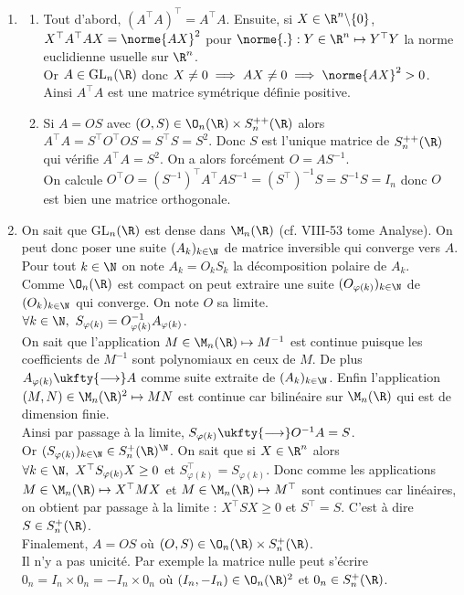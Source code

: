 \documentclass[8pt]{book}
\begin{document}
\begin{enumerate}[leftmargin=*]
\begin{enumerate}[label=\alph*.]
			On vérifie alors que $v=\displaystyle\left(\sum_{j=1}^p\sqrt{\lambda_j}L_j\right)(u)$.
		\end{enumerate}
		\item \begin{enumerate}[label=\alph*.]
			\item Tout d'abord, $\left(A^\top A\right)^\top=A^\top A$. Ensuite, si $X\in \R^n\backslash\{0\}$,\\
			$X^\top A^\top AX=\norme{AX}^2$ pour $\norme{.}:Y\in \R^n\mapsto Y^\top Y$ la norme euclidienne usuelle sur $\R^n$.\\
			Or $A\in \text{GL}_n(\R)$ donc $X\ne 0\implies AX\ne 0\implies \norme{AX}^2>0$. Ainsi $A^\top A$ est une matrice symétrique définie positive.
			\item Si $A=OS$ avec $(O,S)\in \O_n(\R)\times S_n^{++}(\R)$ alors $A^\top A=S^\top O^\top OS=S^\top S=S^2$. Donc $S$ est l'unique matrice de $S_n^{++}(\R)$ qui vérifie $A^\top A=S^2$. On a alors forcément $O=AS^{-1}$.\\
			On calcule $O^\top O=\left(S^{-1}\right)^\top A^\top AS^{-1}=\left(S^\top\right)^{-1}S=S^{-1}S=I_n$ donc $O$ est bien une matrice orthogonale.
		\end{enumerate}
		\item On sait que GL$_n(\R)$ est dense dans $\M_n(\R)$ (cf. VIII-53 tome Analyse). On peut donc poser une suite $(A_k)_{k\in \N}$ de matrice inversible qui converge vers $A$. Pour tout $k\in \N$ on note $A_k=O_kS_k$ la décomposition polaire de $A_k$.\\
		Comme $\O_n(\R)$ est compact on peut extraire une suite $(O_{\varphi(k)})_{k\in \N}$ de $(O_k)_{k\in \N}$ qui converge. On note $O$ sa limite.\\
		$\forall k\in \N,\ S_{\varphi(k)}=O_{\varphi(k)}^{-1}A_{\varphi(k)}$.\\
		On sait que l'application $M\in \M_n(\R)\mapsto M^{-1}$ est continue puisque les coefficients de $M^{-1}$ sont polynomiaux en ceux de $M$. De plus $A_{\varphi(k)}\ukfty{\longrightarrow}A$ comme suite extraite de $(A_k)_{k\in \N}$. Enfin l'application $(M,N)\in \M_n(\R)^2\mapsto MN$ est continue car bilinéaire sur $\M_n(\R)$ qui est de dimension finie.\\
		Ainsi par passage à la limite, $S_{\varphi(k)}\ukfty{\longrightarrow}O^{-1}A=S$.\\
		Or $(S_{\varphi(k)})_{k\in \N}\in S_n^+(\R)^\N$. On sait que si $X\in \R^n$ alors $\forall k\in \N,\ X^\top S_{\varphi(k)}X\geq 0$ et $S_{\varphi(k)}^\top=S_{\varphi(k)}$. Donc comme les applications $M\in \M_n(\R)\mapsto X^\top MX$ et $M\in \M_n(\R)\mapsto M^\top$ sont continues car linéaires, on obtient par passage à la limite : $X^\top SX\geq 0$ et $S^\top=S$. C'est à dire $S\in S_n^+(\R)$.\\
		Finalement, $A=OS$ où $(O,S)\in \O_n(\R)\times S_n^+(\R)$.\\
		Il n'y a pas unicité. Par exemple la matrice nulle peut s'écrire $0_n=I_n\times 0_n=-I_n\times 0_n$ où $(I_n,-I_n)\in \O_n(\R)^2$ et $0_n\in S_n^+(\R)$.
	\end{enumerate}
	
\end{document}
